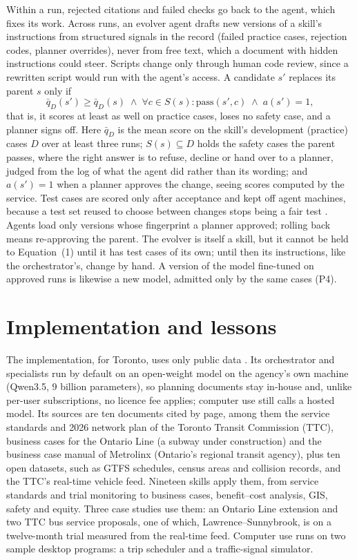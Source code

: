 \documentclass[11pt,a4paper]{article}
\begin{document}
Within a run, rejected citations and failed checks go back to the agent, which fixes its work. Across runs, an evolver agent drafts new versions of a skill's instructions from structured signals in the record (failed practice cases, rejection codes, planner overrides), never from free text, which a document with hidden instructions could steer. Scripts change only through human code review, since a rewritten script would run with the agent's access. A candidate $s'$ replaces its parent $s$ only if
\begin{equation}
\bar{q}_{D}(s') \ge \bar{q}_{D}(s) \;\wedge\; \forall c \in S(s): \mathrm{pass}(s', c) \;\wedge\; a(s') = 1,
\end{equation}
that is, it scores at least as well on practice cases, loses no safety case, and a planner signs off. Here $\bar{q}_{D}$ is the mean score on the skill's development (practice) cases $D$ over at least three runs; $S(s) \subseteq D$ holds the safety cases the parent passes, where the right answer is to refuse, decline or hand over to a planner, judged from the log of what the agent did rather than its wording; and $a(s') = 1$ when a planner approves the change, seeing scores computed by the service. Test cases are scored only after acceptance and kept off agent machines, because a test set reused to choose between changes stops being a fair test \citep{dwork2015reusable}. Agents load only versions whose fingerprint a planner approved; rolling back means re-approving the parent. The evolver is itself a skill, but it cannot be held to Equation~(1) until it has test cases of its own; until then its instructions, like the orchestrator's, change by hand. A version of the model fine-tuned on approved runs is likewise a new model, admitted only by the same cases (P4).

\section{Implementation and lessons}\label{implementation}

The implementation, for Toronto, uses only public data \citep{li2026transitagents}. Its orchestrator and specialists run by default on an open-weight model on the agency's own machine (Qwen3.5, 9 billion parameters), so planning documents stay in-house and, unlike per-user subscriptions, no licence fee applies; computer use still calls a hosted model. Its sources are ten documents cited by page, among them the service standards and 2026 network plan of the Toronto Transit Commission (TTC), business cases for the Ontario Line (a subway under construction) and the business case manual of Metrolinx (Ontario's regional transit agency), plus ten open datasets, such as GTFS schedules, census areas and collision records, and the TTC's real-time vehicle feed. Nineteen skills apply them, from service standards and trial monitoring to business cases, benefit--cost analysis, GIS, safety and equity. Three case studies use them: an Ontario Line extension and two TTC bus service proposals, one of which, Lawrence--Sunnybrook, is on a twelve-month trial measured from the real-time feed. Computer use runs on two sample desktop programs: a trip scheduler and a traffic-signal simulator.
\end{document}
